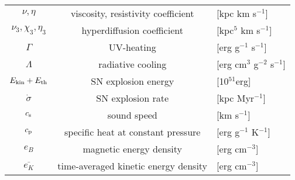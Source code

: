 \documentclass[preprint2]{aastex63}
\newcommand\latex{La\TeX}
\newcommand\ESK{E_{\rm kin}}
\newcommand\EST{E_{\rm th}}
\newcommand{\fag}[1]{\textcolor{midgreen}{FAG: #1}}
\begin{document}
\begin{table*}[h]
\begin{tabular}{ccl}
 $\nu,\eta$ & viscosity, resistivity coefficient& [kpc km s$^{-1}$]\\
 $\nu_3,\chi_3,\eta_3$ & hyperdiffusion coefficient& [kpc$^{5}$ km s$^{-1}$]\\
 $\Gamma$ & UV-heating& [erg g$^{-1}$ s$^{-1}$]\\
 $\Lambda$ & radiative cooling& [erg cm$^{3}$ g$^{-2}$ s$^{-1}$]\\
 $\ESK+\EST$ & SN explosion energy& [10$^{51}$erg]\\
 $\dot\sigma$ & SN explosion rate & [kpc Myr$^{-1}$]\\
 $c_{\rm s}$ & sound speed & [km s$^{-1}$]\\
 $c_{\rm p}$ & specific heat at constant pressure & [erg g$^{-1}$ K$^{-1}$]\\
 $e_B$ & magnetic energy density & [erg cm$^{-3}$]\\
 $\overline{e_K}$ & time-averaged kinetic energy density & [erg cm$^{-3}$]\\
\hline
\end{tabular}
\end{table*}


\end{document}
